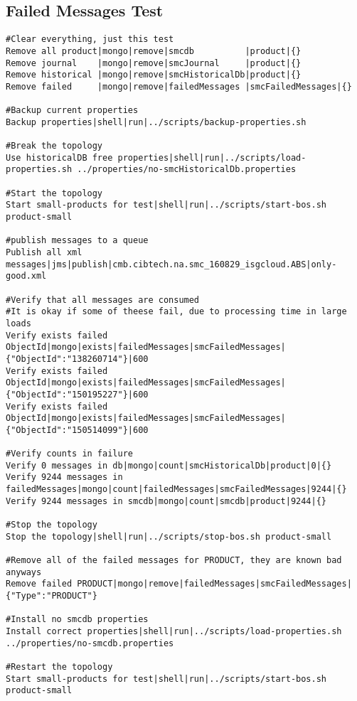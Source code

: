 \documentclass[12pt,a4paper,koma]{article}
\begin{document}
\subsection{Failed Messages Test}
\label{sec-9-2}
\begin{scriptsize}
\begin{verbatim}
#Clear everything, just this test
Remove all product|mongo|remove|smcdb          |product|{}
Remove journal    |mongo|remove|smcJournal     |product|{}
Remove historical |mongo|remove|smcHistoricalDb|product|{}
Remove failed     |mongo|remove|failedMessages |smcFailedMessages|{}

#Backup current properties
Backup properties|shell|run|../scripts/backup-properties.sh

#Break the topology
Use historicalDB free properties|shell|run|../scripts/load-properties.sh ../properties/no-smcHistoricalDb.properties

#Start the topology
Start small-products for test|shell|run|../scripts/start-bos.sh product-small

#publish messages to a queue
Publish all xml messages|jms|publish|cmb.cibtech.na.smc_160829_isgcloud.ABS|only-good.xml

#Verify that all messages are consumed
#It is okay if some of theese fail, due to processing time in large loads
Verify exists failed ObjectId|mongo|exists|failedMessages|smcFailedMessages|{"ObjectId":"138260714"}|600
Verify exists failed ObjectId|mongo|exists|failedMessages|smcFailedMessages|{"ObjectId":"150195227"}|600
Verify exists failed ObjectId|mongo|exists|failedMessages|smcFailedMessages|{"ObjectId":"150514099"}|600

#Verify counts in failure
Verify 0 messages in db|mongo|count|smcHistoricalDb|product|0|{}
Verify 9244 messages in failedMessages|mongo|count|failedMessages|smcFailedMessages|9244|{}
Verify 9244 messages in smcdb|mongo|count|smcdb|product|9244|{}

#Stop the topology
Stop the topology|shell|run|../scripts/stop-bos.sh product-small

#Remove all of the failed messages for PRODUCT, they are known bad anyways
Remove failed PRODUCT|mongo|remove|failedMessages|smcFailedMessages|{"Type":"PRODUCT"}

#Install no smcdb properties
Install correct properties|shell|run|../scripts/load-properties.sh ../properties/no-smcdb.properties

#Restart the topology
Start small-products for test|shell|run|../scripts/start-bos.sh product-small


\end{verbatim}
\end{scriptsize}
\end{document}
